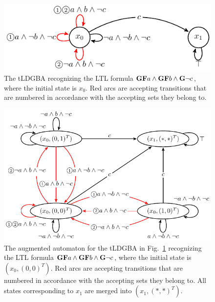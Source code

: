 \begin{figure}[htbp]
   \centering
   \includegraphics[bb=0 0 247 80,scale=0.8]{ldgba_original.pdf}
   \caption{The tLDGBA recognizing the LTL formula $\text{{\bf GF}}a \wedge \text{{\bf GF}}b \wedge \text{{\bf G}}\neg c$, where the initial state is $x_0$. Red arcs are accepting transitions that are numbered in accordance with the accepting sets they belong to.}
   \label{automaton}
\end{figure}
\begin{figure}[htbp]
   \centering
   \includegraphics[bb=0 0 326 207,scale=0.8]{ldgba.pdf}
   \caption{The augmented automaton for the tLDGBA in Fig.~\ref{automaton} recognizing the LTL formula $\text{{\bf GF}}a \wedge \text{{\bf GF}}b \wedge \text{{\bf G}}\neg c$, where the initial state is $(x_0, (0,0)^T )$. Red arcs are accepting transitions that are numbered in accordance with the accepting sets they belong to. All states corresponding to $x_1$ are merged into $(x_1, (*,*)^T )$.}
   \label{automaton_aug}
\end{figure}

